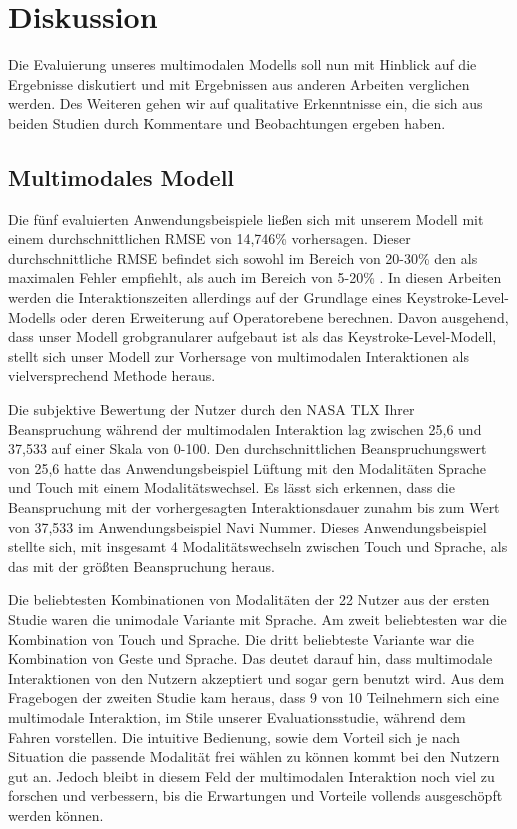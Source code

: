 \clearpage
\section[Diskussion]{Diskussion}
Die Evaluierung unseres multimodalen Modells soll nun mit Hinblick auf die Ergebnisse diskutiert und mit Ergebnissen aus anderen Arbeiten verglichen werden. Des Weiteren gehen wir auf qualitative Erkenntnisse ein, die sich aus beiden Studien durch Kommentare und Beobachtungen ergeben haben.

\subsection[Modell]{Multimodales Modell}
Die fünf evaluierten Anwendungsbeispiele ließen sich mit unserem Modell mit einem durchschnittlichen RMSE von 14,746\% vorhersagen. Dieser durchschnittliche RMSE befindet sich sowohl im Bereich von 20-30\% den \citet{Card_1980} als maximalen Fehler empfiehlt, als auch im Bereich von 5-20\% \citep{Luo_2005,Teo:2006}. 
In diesen Arbeiten werden die Interaktionszeiten allerdings auf der Grundlage eines Keystroke-Level-Modells oder deren Erweiterung auf Operatorebene berechnen. 
Davon ausgehend, dass unser Modell grobgranularer aufgebaut ist als das Keystroke-Level-Modell, stellt sich unser Modell zur Vorhersage von multimodalen Interaktionen als vielversprechend Methode heraus. 

Die subjektive Bewertung der Nutzer durch den NASA TLX Ihrer Beanspruchung während der multimodalen Interaktion lag zwischen 25,6 und 37,533 auf einer Skala von 0-100. 
Den durchschnittlichen Beanspruchungswert von 25,6 hatte das Anwendungsbeispiel Lüftung mit den Modalitäten Sprache und Touch mit einem Modalitätswechsel. 
Es lässt sich erkennen, dass die Beanspruchung mit der vorhergesagten Interaktionsdauer zunahm bis zum Wert von 37,533 im Anwendungsbeispiel Navi Nummer. 
Dieses Anwendungsbeispiel stellte sich, mit insgesamt 4 Modalitätswechseln zwischen Touch und Sprache, als das mit der größten Beanspruchung heraus.  

Die beliebtesten Kombinationen von Modalitäten der 22 Nutzer aus der ersten Studie waren die unimodale Variante mit Sprache. 
Am zweit beliebtesten war die Kombination von Touch und Sprache. 
Die dritt beliebteste Variante war die Kombination von Geste und Sprache. 
Das deutet darauf hin, dass multimodale Interaktionen von den Nutzern akzeptiert und sogar gern benutzt wird. 
Aus dem Fragebogen der zweiten Studie kam heraus, dass 9 von 10 Teilnehmern sich eine multimodale Interaktion, im Stile unserer Evaluationsstudie, während dem Fahren vorstellen. 
Die intuitive Bedienung, sowie dem Vorteil sich je nach Situation die passende Modalität frei wählen zu können kommt bei den Nutzern gut an. 
Jedoch bleibt in diesem Feld der multimodalen Interaktion noch viel zu forschen und verbessern, bis die Erwartungen und Vorteile vollends ausgeschöpft werden können.

